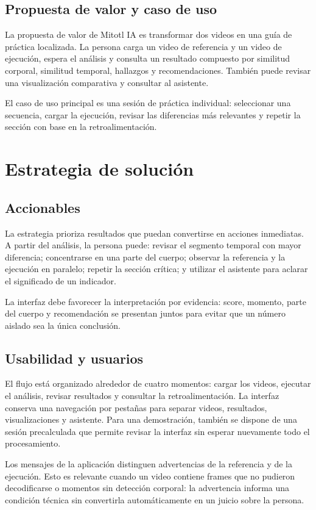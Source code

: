 \documentclass[12pt,a4paper]{article}
\begin{document}
\subsection{Propuesta de valor y caso de uso}
La propuesta de valor de Mitotl IA es transformar dos videos en una guía de práctica localizada. La persona carga un video de referencia y un video de ejecución, espera el análisis y consulta un resultado compuesto por similitud corporal, similitud temporal, hallazgos y recomendaciones. También puede revisar una visualización comparativa y consultar al asistente.

El caso de uso principal es una sesión de práctica individual: seleccionar una secuencia, cargar la ejecución, revisar las diferencias más relevantes y repetir la sección con base en la retroalimentación.

\section{Estrategia de solución}
\subsection{Accionables}
La estrategia prioriza resultados que puedan convertirse en acciones inmediatas. A partir del análisis, la persona puede: revisar el segmento temporal con mayor diferencia; concentrarse en una parte del cuerpo; observar la referencia y la ejecución en paralelo; repetir la sección crítica; y utilizar el asistente para aclarar el significado de un indicador.

La interfaz debe favorecer la interpretación por evidencia: score, momento, parte del cuerpo y recomendación se presentan juntos para evitar que un número aislado sea la única conclusión.
\subsection{Usabilidad y usuarios}
El flujo está organizado alrededor de cuatro momentos: cargar los videos, ejecutar el análisis, revisar resultados y consultar la retroalimentación. La interfaz conserva una navegación por pestañas para separar videos, resultados, visualizaciones y asistente. Para una demostración, también se dispone de una sesión precalculada que permite revisar la interfaz sin esperar nuevamente todo el procesamiento.

Los mensajes de la aplicación distinguen advertencias de la referencia y de la ejecución. Esto es relevante cuando un video contiene frames que no pudieron decodificarse o momentos sin detección corporal: la advertencia informa una condición técnica sin convertirla automáticamente en un juicio sobre la persona.
\end{document}
